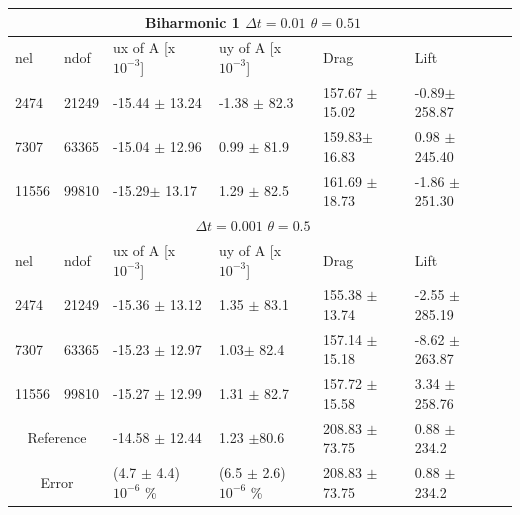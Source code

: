 \begin{table}[h!]
\centering
\label{my-label}
\begin{tabular}{ |p{1cm}||p{1cm}|p{3.2cm}|p{3.2cm}|p{2.9cm}|p{3.1cm}|p{1.2cm}|}
 \hline
  \multicolumn{6}{|c|}{Biharmonic 1 \hspace{2mm} $\Delta t = 0.01$  \hspace{2mm}  $\theta = 0.51$} \\
   \hline
nel & ndof & ux of A [x $10^{-3}$]  &uy of A [x $10^{-3}$]& Drag  & Lift \\
 \hline
 2474    & 21249  & -15.44 $\pm$  13.24 & -1.38 $\pm$  82.3   & 157.67  $\pm$  15.02 & -0.89$\pm$ 258.87 \\
 7307    & 63365  & -15.04 $\pm$ 12.96  & 0.99  $\pm$ 81.9 & 159.83$\pm$  16.83 & 0.98 $\pm$  245.40  \\
 11556   & 99810  & -15.29$\pm$ 13.17   & 1.29 $\pm$ 82.5 &  161.69 $\pm$   18.73 & -1.86 $\pm$ 251.30 \\
 \hline
  \multicolumn{6}{|c|}{$\Delta t = 0.001$  \hspace{2mm}  $\theta = 0.5$} \\
   \hline
 nel & ndof & ux of A [x $10^{-3}$]  &uy of A [x $10^{-3}$]& Drag  & Lift \\
\hline
 2474    & 21249  & -15.36 $\pm$ 13.12 &  1.35 $\pm$ 83.1& 155.38   $\pm$   13.74 & -2.55 $\pm$ 285.19 \\ 
 7307    & 63365  & -15.23 $\pm$ 12.97 & 1.03$\pm$ 82.4 & 157.14  $\pm$  15.18 & -8.62   $\pm$  263.87 \\
 11556   & 99810  &-15.27 $\pm$ 12.99 & 1.31 $\pm$ 82.7 & 157.72  $\pm$ 15.58 & 3.34    $\pm$ 258.76  \\
 \hline
  \multicolumn{2}{|c|}{Reference} & -14.58 $\pm$ 12.44   & 1.23 $\pm$80.6    & 208.83 $\pm$ 73.75 & 0.88 $\pm$ 234.2 \\
 \hline
\multicolumn{2}{|c|}{Error}  & (4.7 $\pm$ 4.4)$10^{-6}$ \% & (6.5 $\pm$ 2.6)$10^{-6}$ \%  & 208.83 $\pm$ 73.75 & 0.88 $\pm$ 234.2 \\
 \hline
\end{tabular}
\end{table}

